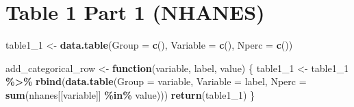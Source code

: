 \documentclass[
]{article}
\newenvironment{Shaded}{\begin{snugshade}}{\end{snugshade}}
\newcommand{\ControlFlowTok}[1]{\textcolor[rgb]{0.13,0.29,0.53}{\textbf{#1}}}
\newcommand{\FunctionTok}[1]{\textcolor[rgb]{0.13,0.29,0.53}{\textbf{#1}}}
\newcommand{\NormalTok}[1]{#1}
\newcommand{\OtherTok}[1]{\textcolor[rgb]{0.56,0.35,0.01}{#1}}
\newcommand{\SpecialCharTok}[1]{\textcolor[rgb]{0.81,0.36,0.00}{\textbf{#1}}}
\newcommand{\StringTok}[1]{\textcolor[rgb]{0.31,0.60,0.02}{#1}}
\begin{document}
\section{Table 1 Part 1 (NHANES)}\label{table-1-part-1-nhanes}

\begin{Shaded}
\begin{Highlighting}[]
\NormalTok{table1\_1 }\OtherTok{\textless{}{-}} \FunctionTok{data.table}\NormalTok{(}\StringTok{\textquotesingle{}Group\textquotesingle{}} \OtherTok{=} \FunctionTok{c}\NormalTok{(), }\StringTok{\textquotesingle{}Variable\textquotesingle{}} \OtherTok{=} \FunctionTok{c}\NormalTok{(), }\StringTok{\textquotesingle{}Nperc\textquotesingle{}} \OtherTok{=} \FunctionTok{c}\NormalTok{())}

\NormalTok{add\_categorical\_row }\OtherTok{\textless{}{-}} \ControlFlowTok{function}\NormalTok{(variable, label, value) \{}
\NormalTok{  table1\_1 }\OtherTok{\textless{}{-}}\NormalTok{ table1\_1 }\SpecialCharTok{\%\textgreater{}\%} \FunctionTok{rbind}\NormalTok{(}\FunctionTok{data.table}\NormalTok{(}\StringTok{\textquotesingle{}Group\textquotesingle{}} \OtherTok{=}\NormalTok{ variable, }
                                        \StringTok{\textquotesingle{}Variable\textquotesingle{}} \OtherTok{=}\NormalTok{ label,}
                                        \StringTok{\textquotesingle{}Nperc\textquotesingle{}} \OtherTok{=} \FunctionTok{sum}\NormalTok{(nhanes[[variable]] }\SpecialCharTok{\%in\%}\NormalTok{ value)))}
  \FunctionTok{return}\NormalTok{(table1\_1)}
\NormalTok{\}}


\end{Highlighting}
\end{Shaded}
\end{document}
